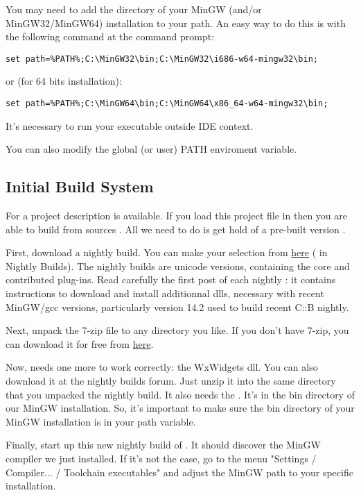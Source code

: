 You may need to add the  directory of your MinGW (and/or MinGW32/MinGW64) installation to your path. An easy way to do this is with the following command at the command prompt:

\begin{verbatim}
set path=%PATH%;C:\MinGW32\bin;C:\MinGW32\i686-w64-mingw32\bin;
\end{verbatim}
or (for 64 bits installation):
\begin{verbatim}
set path=%PATH%;C:\MinGW64\bin;C:\MinGW64\x86_64-w64-mingw32\bin;
\end{verbatim}

It's necessary to run your executable outside \codeblocks IDE context.

You can also modify the global (or user) PATH enviroment variable.


\subsection{Initial Build System}

For \href{https://www.codeblocks.org/}{\codeblocks} a project description  is available. If you load this project file in \codeblocks then you are able to build \codeblocks from sources \cite{url:cb}. All we need to do is get hold of a pre-built version \codeblocks.

First, download a nightly build. You can make your selection from \href{https://forums.codeblocks.org/}{here} (\cite{url:cbforum} in Nightly Builds). The nightly builds are unicode versions, containing the core and contributed plug-ins. Read carefully the first post of each nightly : it contains instructions to download and install additionnal dlls, necessary with recent MinGW/gcc versions, particularly version 14.2 used to build recent C::B nightly.

Next, unpack the 7-zip file \cite{url:zip} to any directory you like. If you don't have 7-zip, you can download it for free from \href{https://www.7-zip.org}{here}.

Now, \codeblocks needs one more  to work correctly: the WxWidgets dll. You can also download it at the nightly builds forum. Just unzip it into the same directory that you unpacked the \codeblocks nightly build. It also needs the . It's in the bin directory of our MinGW installation. So, it's important to make sure the bin directory of your MinGW installation is in your path variable.

Finally, start up this new nightly build of \codeblocks. It should discover the MinGW compiler we just installed. If it's not the case, go to the menu "Settings / Compiler... / Toolchain executables" and adjust the MinGW path to your specific installation.

